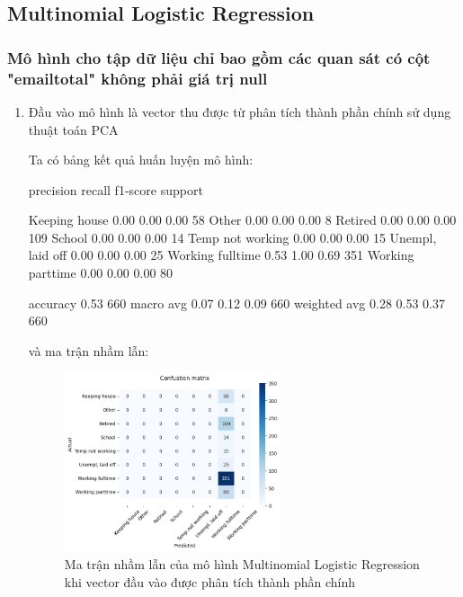 \subsection{Multinomial Logistic Regression}

\subsubsection{Mô hình cho tập dữ liệu chỉ bao gồm các quan sát có cột "emailtotal" không phải giá trị null}

\begin{enumerate}[label=(\alph*)]
    \item Đầu vào mô hình là vector thu được từ phân tích thành phần chính sử dụng thuật toán PCA
    
    Ta có bảng kết quả huấn luyện mô hình:

    \begin{python}
        precision    recall  f1-score   support

        Keeping house       0.00      0.00      0.00        58
                Other       0.00      0.00      0.00         8
              Retired       0.00      0.00      0.00       109
               School       0.00      0.00      0.00        14
     Temp not working       0.00      0.00      0.00        15
     Unempl, laid off       0.00      0.00      0.00        25
     Working fulltime       0.53      1.00      0.69       351
     Working parttime       0.00      0.00      0.00        80
     
             accuracy                           0.53       660
            macro avg       0.07      0.12      0.09       660
         weighted avg       0.28      0.53      0.37       660
    \end{python}

    và ma trận nhầm lẫn:

    \begin{figure}[H]
        \centering
        \includegraphics[width=0.6\textwidth]{figures/Thanh/Models/Logistic/Non_null_models_confusion_matrix_Logistic_PCA_features.png}
        \caption{Ma trận nhầm lẫn của mô hình Multinomial Logistic Regression khi vector đầu vào được phân tích thành phần chính}
        \label{fig:Non_null_models_confusion_matrix_Logistic_PCA_features}
    \end{figure}


\end{enumerate}
